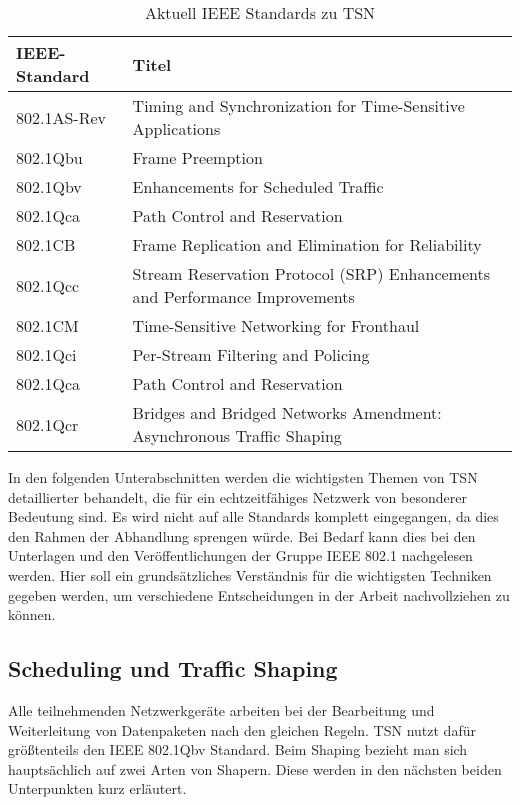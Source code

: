 \begin{table}[!htb]
	\centering
	\begin{tabularx}{\textwidth}{p{}|X}
		IEEE-Standard & Titel\\
		\hline \hline
		802.1AS-Rev & Timing and Synchronization for Time-Sensitive Applications \cite{IEEE802_1AS}\\
		802.1Qbu & Frame Preemption \cite{IEEE802_1Qbu}\\
		802.1Qbv & Enhancements for Scheduled Traffic \cite{IEEE802_1Qbv}\\
		802.1Qca & Path Control and Reservation \cite{IEEE802_1Qca}\\
		802.1CB & Frame Replication and Elimination for Reliability \cite{IEEE802_1CB}\\
		802.1Qcc & Stream Reservation Protocol (SRP) Enhancements and Performance Improvements \cite{IEEE802_1Qcc}\\
		802.1CM & Time-Sensitive Networking for Fronthaul \cite{IEEE802_1CM}\\
		802.1Qci & Per-Stream Filtering and Policing \cite{IEEE802_1Qci}\\
		802.1Qca & Path Control and Reservation \cite{IEEE802_1Qca}\\
		802.1Qcr & Bridges and Bridged Networks Amendment: Asynchronous Traffic
		Shaping \cite{IEEE802_1Qcr}
	\end{tabularx}
	\caption[Aktuell IEEE Standards zu TSN]{Aktuell \acs{IEEE} Standards zu \acs{TSN}}
	\label{tab:TSN}
\end{table}

In den folgenden Unterabschnitten werden die wichtigsten Themen von \acs{TSN} detaillierter behandelt, die für ein echtzeitfähiges Netzwerk von besonderer Bedeutung sind. Es wird nicht auf alle Standards komplett eingegangen, da dies den Rahmen der Abhandlung sprengen würde. Bei Bedarf kann dies bei den Unterlagen und den Veröffentlichungen der Gruppe IEEE 802.1 nachgelesen werden. Hier soll ein grundsätzliches Verständnis für die wichtigsten Techniken gegeben werden, um verschiedene Entscheidungen in der Arbeit nachvollziehen zu können.

\subsection{Scheduling und Traffic Shaping}\label{sec:TrafficScheduling}
Alle teilnehmenden Netzwerkgeräte arbeiten bei der Bearbeitung und Weiterleitung von Datenpaketen nach den gleichen Regeln. \ac{TSN} nutzt dafür größtenteils den IEEE 802.1Qbv Standard. Beim Shaping bezieht man sich hauptsächlich auf zwei Arten von Shapern. Diese werden in den nächsten beiden Unterpunkten kurz erläutert.

